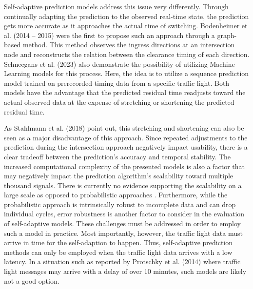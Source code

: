 Self-adaptive prediction models address this issue very differently. Through continually adapting the prediction to the observed real-time state, the prediction gets more accurate as it approaches the actual time of switching. Bodenheimer et al. (2014 -- 2015) \cite{bodenheimer_enabling_2014, bodenheimer_glosa_2015} were the first to propose such an approach through a graph-based method. This method observes the ingress directions at an intersection node and reconstructs the relation between the clearance timing of each direction. Schneegans et al. (2023) \cite{schneegans_prediction_2023} also demonstrate the possibility of utilizing Machine Learning models for this process. Here, the idea is to utilize a sequence prediction model trained on prerecorded timing data from a specific traffic light. Both models have the advantage that the predicted residual time readjusts toward the actual observed data at the expense of stretching or shortening the predicted residual time.

As Stahlmann et al. (2018) \cite{stahlmann_exploring_2018} point out, this stretching and shortening can also be seen as a major disadvantage of this approach. Since repeated adjustments to the prediction during the intersection approach negatively impact usability, there is a clear tradeoff between the prediction's accuracy and temporal stability. The increased computational complexity of the presented models is also a factor that may negatively impact the prediction algorithm's scalability toward multiple thousand signals. There is currently no evidence supporting the scalability on a large scale as opposed to probabilistic approaches \cite{protschky_extensive_2014, protschky_adaptive_2014}. Furthermore, while the probabilistic approach is intrinsically robust to incomplete data and can drop individual cycles, error robustness is another factor to consider in the evaluation of self-adaptive models. These challenges must be addressed in order to employ such a model in practice. Most importantly, however, the traffic light data must arrive in time for the self-adaption to happen. Thus, self-adaptive prediction methods can only be employed when the traffic light data arrives with a low latency. In a situation such as reported by Protschky et al. (2014) \cite{protschky_extensive_2014, protschky_adaptive_2014} where traffic light messages may arrive with a delay of over 10 minutes, such models are likely not a good option.

